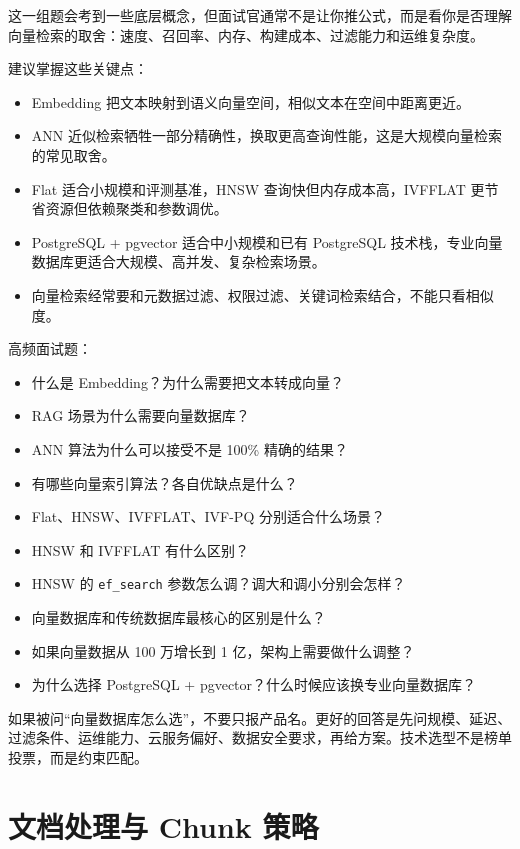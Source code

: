\documentclass[9pt,a4paper,twocolumn]{ctexart}
\begin{document}
这一组题会考到一些底层概念，但面试官通常不是让你推公式，而是看你是否理解向量检索的取舍：速度、召回率、内存、构建成本、过滤能力和运维复杂度。



建议掌握这些关键点：


\begin{itemize}[itemsep=1pt, topsep=2pt]
  \item Embedding 把文本映射到语义向量空间，相似文本在空间中距离更近。
  \item ANN 近似检索牺牲一部分精确性，换取更高查询性能，这是大规模向量检索的常见取舍。
  \item Flat 适合小规模和评测基准，HNSW 查询快但内存成本高，IVFFLAT 更节省资源但依赖聚类和参数调优。
  \item PostgreSQL + pgvector 适合中小规模和已有 PostgreSQL 技术栈，专业向量数据库更适合大规模、高并发、复杂检索场景。
  \item 向量检索经常要和元数据过滤、权限过滤、关键词检索结合，不能只看相似度。
\end{itemize}


高频面试题：


\begin{itemize}[itemsep=1pt, topsep=2pt]
  \item 什么是 Embedding？为什么需要把文本转成向量？
  \item RAG 场景为什么需要向量数据库？
  \item ANN 算法为什么可以接受不是 100\% 精确的结果？
  \item 有哪些向量索引算法？各自优缺点是什么？
  \item Flat、HNSW、IVFFLAT、IVF-PQ 分别适合什么场景？
  \item HNSW 和 IVFFLAT 有什么区别？
  \item HNSW 的 \texttt{ef\_search} 参数怎么调？调大和调小分别会怎样？
  \item 向量数据库和传统数据库最核心的区别是什么？
  \item 如果向量数据从 100 万增长到 1 亿，架构上需要做什么调整？
  \item 为什么选择 PostgreSQL + pgvector？什么时候应该换专业向量数据库？
\end{itemize}


如果被问“向量数据库怎么选”，不要只报产品名。更好的回答是先问规模、延迟、过滤条件、运维能力、云服务偏好、数据安全要求，再给方案。技术选型不是榜单投票，而是约束匹配。



\section*{文档处理与 Chunk 策略}
\end{document}
